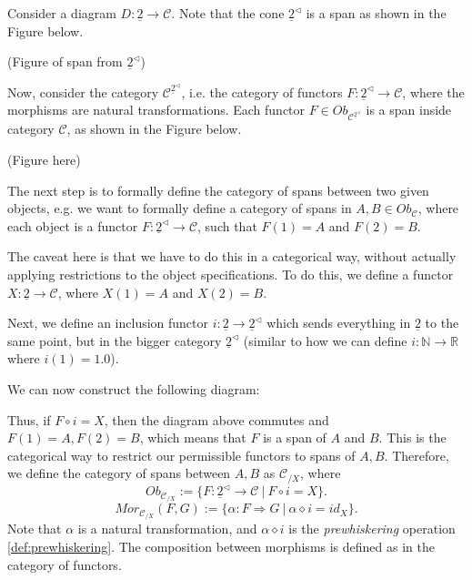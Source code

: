 \begin{example}
	Consider a diagram $D:\underline{2}\to \mathcal C$. Note that
	the cone $\underline{2}^{\lhd}$ is a span as shown in the Figure below.

	(Figure of span from $\underline{2}^{\lhd}$)

	Now, consider the category $\mathcal C^{\underline{2}^{\lhd}}$, i.e.
	the category of functors $F:\underline{2}^{\lhd} \to \mathcal C$,
	where the morphisms are natural transformations.
	Each functor $F \in Ob_{\mathcal C^{\underline{2}^{\lhd}}}$
	is a span inside category $\mathcal C$, as shown in the Figure below.

	(Figure here)

	The next step is to formally define the category of spans between two given objects,
	e.g. we want to formally define a category of spans in $A, B \in Ob_\mathcal C$,
	where each object is a functor $F:\underline{2}^{\lhd}\to \mathcal C$,
	such that $F(1) = A$ and $F(2) = B$.

	The caveat here is that we have to do this in a categorical way, without actually applying restrictions
	to the object specifications. To do this, we define a functor
	$X:\underline{2} \to \mathcal C$, where $X(1) = A$ and $X(2)= B$.

	Next, we define an inclusion functor $i: \underline{2} \to \underline{2}^{\lhd}$ which sends
	everything in $\underline{2}$ to the same point, but in the bigger category $\underline{2}^{\lhd}$
	(similar to how we can define $i: \mathbb N \to \mathbb R$ where $i(1) = 1.0$).

	We can now construct the following diagram:

	Thus, if $F\circ i = X$, then the diagram above commutes and $F(1) = A, F(2) = B$, which means
	that $F$ is a span of $A$ and $B$. This is the categorical way to restrict our permissible functors
	to spans of $A,B$. Therefore, we define the category of spans between $A,B$ as
	$\mathcal C_{/ X}$, where
	\begin{displaymath}
		Ob_{\mathcal C_{/ X}}:=\{
		F: \underline{2}^\lhd \to \mathcal C \ | \ F \circ i = X
		\}.
	\end{displaymath}
	\begin{displaymath}
		Mor_{\mathcal C_{/X}}(F,G):=\{
		\alpha: F \Rightarrow G \ | \ \alpha \diamond i = id_{X}
		\}.
	\end{displaymath}
	Note that $\alpha$ is a natural transformation, and $\alpha \diamond i$ is the \textit{prewhiskering}
	operation \ref{def:prewhiskering}. The composition between morphisms is defined as in the category of functors.


\end{example}
